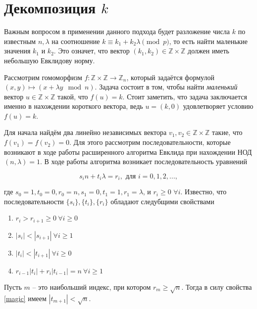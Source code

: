 \documentclass[a4paper,12pt]{article}
\theoremstyle{definition}
\theoremstyle{underline}
\begin{document}
	\section{Декомпозиция $k$}
	
	Важным вопросом в применении данного подхода будет разложение числа $k$ по известным $n, \lambda$ на соотношение $k \equiv k_1 + k_2 \lambda \pmod{p}$, то есть найти маленькие значения $k_1$ и $k_2$. Это означет, что вектор $(k_1, k_2) \in \mathbb{Z} \times \mathbb{Z}$ должен иметь небольшую Евклидову норму.
	
	Рассмотрим гомоморфизм $f: \mathbb{Z} \times \mathbb{Z} \rightarrow \mathbb{Z}_n$, который задаётся формулой $(x, y)  \mapsto (x + \lambda y \mod n) $. Задача состоит в том, чтобы найти \emph{маленький} вектор $u \in  \mathbb{Z} \times \mathbb{Z}$ такой, что $f(u)=k$. Стоит заметить, что задача заключается именно в нахождении короткого вектора, ведь $u=(k, 0)$ удовлетворяет условию $f(u)=k$.
	
	Для начала найдём два линейно независимых вектора $v_1, v_2 \in \mathbb{Z} \times \mathbb{Z}$  такие, что $f(v_1)=f(v_2)=0$. Для этого рассмотрим последовательности, которые возникают в ходе работы расширенного алгоритма Евклида при нахождении НОД$(n, \lambda)=1$. В ходе работы алгоритма возникает последовательность уравнений 
	
	\begin{equation} \label{extEuclid}
		s_i n + t_i \lambda = r_i, \text{ для } i=0,1,2,...,
	\end{equation}
	
	где $s_0=1, t_0=0, r_0=n, s_1=0, t_1=1, r_1=\lambda$, и $r_i \geqslant 0$ $\forall i$. Известно, что последовательности $\{s_i\}, \{t_i\}, \{r_i\}$ обладают следубщими свойствами
	
	\begin{enumerate}[label=\arabic*),topsep=0pt,itemsep=-0.5ex,partopsep=1ex,parsep=1ex]
		\item $r_i > r_{i+1} \geqslant 0 \ \forall i \geqslant 0$
		\item $|s_i| < |s_{i+1}| \ \forall i \geqslant 1$
		\item $|t_i| < |t_{i+1}| \ \forall i \geqslant 0$
		\item \label{magic} $r_{i-1}|t_i| + r_i|t_{i-1}| = n \ \forall i \geqslant 1$ 
	\end{enumerate}

	Пусть $m$ -- это наибольший индекс, при котором $r_m \geqslant \sqrt{n}$. Тогда в силу свойства \ref{magic} имеем $|t_{m+1}| < \sqrt{n}$. 
	
\end{document}

